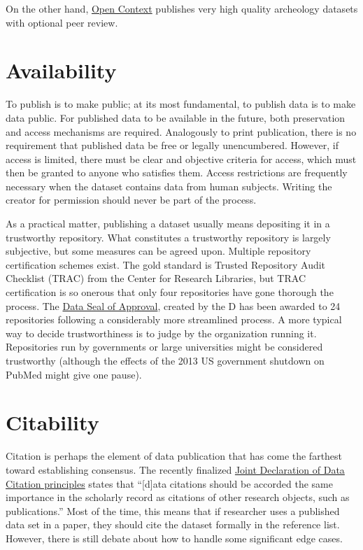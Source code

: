 \documentclass[10pt,a4paper,twocolumn]{article}
\begin{document}
On the other hand, \href{http://opencontext.org/}{Open Context} publishes very high quality archeology datasets with optional peer review.


\section*{Availability}\label{availability}

To publish is to make public; at its most fundamental, to publish data is to make data public. 
For published data to be available in the future, both preservation and access mechanisms are required.
Analogously to print publication, there is no requirement that published data be free or legally unencumbered.
However, if access is limited, there must be clear and objective criteria for access, which must then be granted to anyone who satisfies them. 
Access restrictions are frequently necessary when the dataset contains data from human subjects. 
Writing the creator for permission should never be part of the process.

As a practical matter, publishing a dataset usually means depositing it in a trustworthy repository. 
What constitutes a trustworthy repository is largely subjective, but some measures can be agreed upon. 
Multiple repository certification schemes exist.
The gold standard is Trusted Repository Audit Checklist (TRAC)\cite{trac_2007} from the Center for Research Libraries, but TRAC certification is so onerous that only four repositories have gone thorough the process.  
The \href{http://datasealofapproval.org/}{Data Seal of Approval}, created by the D has been awarded to 24 repositories following a considerably more streamlined process. 
A more typical way to decide trustworthiness is to judge by the organization running it. 
Repositories run by governments or large universities might be considered trustworthy (although the effects of the 2013 US government shutdown on PubMed might give one pause).


\section*{Citability}\label{citability}

Citation is perhaps the element of data publication that has come the farthest toward establishing consensus.
The recently finalized \href{http://www.force11.org/datacitation}{Joint Declaration of Data Citation principles} states that ``[d]ata citations should be accorded the same importance in the scholarly record as citations of other research objects, such as publications.''
Most of the time, this means that if researcher uses a published data set in a paper, they should cite the dataset formally in the reference list. 
However, there is still debate about how to handle some significant edge cases. %
\end{document}

